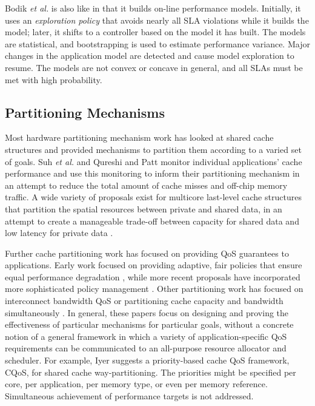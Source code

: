 %
Bodik \emph{et al.}\cite{bodik-acdc09} is also like \pacora in that it builds on-line performance models.
Initially, it uses an \emph{exploration policy} that avoids nearly all SLA violations while it builds the model;
later, it shifts to a controller based on the model it has built.
The models are statistical, and bootstrapping is used to estimate performance variance.
Major changes in the application model are detected and cause model exploration to resume.
The models are not convex or concave in general, and all SLAs must be met with high probability.

\subsection*{Partitioning Mechanisms}
\label{sec:rel:pm}

%
Most hardware partitioning mechanism work has looked at shared cache structures and provided mechanisms to partition them according to a varied set of goals.  Suh \emph{et al.}\cite{876484, 967444} and Qureshi and Patt \cite{1194855} monitor individual applications' cache performance and use this monitoring to inform their partitioning mechanism in an attempt to reduce the total amount of cache misses and off-chip memory traffic. A wide variety of proposals exist for multicore last-level cache structures that partition the spatial resources between private and shared data, in an attempt to create a manageable trade-off between capacity for shared data and low latency for private data \cite{1275005,1194858,1318096,1088154,1399973,1069998,1399982}.

Further cache partitioning work has focused on providing QoS guarantees to applications. Early work focused on providing adaptive, fair policies that ensure equal performance degradation \cite{605420,1086328}, while more recent proposals have incorporated more sophisticated policy management \cite{1241608,1331730,1152161,1254886}. Other partitioning work has focused on interconnect bandwidth QoS \cite{1382130} or partitioning cache capacity and bandwidth simultaneously \cite{1250671}. In general, these papers focus on designing and proving the effectiveness of particular mechanisms for particular goals, without a concrete notion of a general framework in which a variety of application-specific QoS requirements can be communicated to an all-purpose resource allocator and scheduler.
%
For example, Iyer\cite{1006246} suggests a priority-based cache QoS framework, CQoS, for shared cache way-partitioning.
The priorities might be specified per core, per application, per memory type, or even per memory reference.
Simultaneous achievement of performance targets is not addressed.

